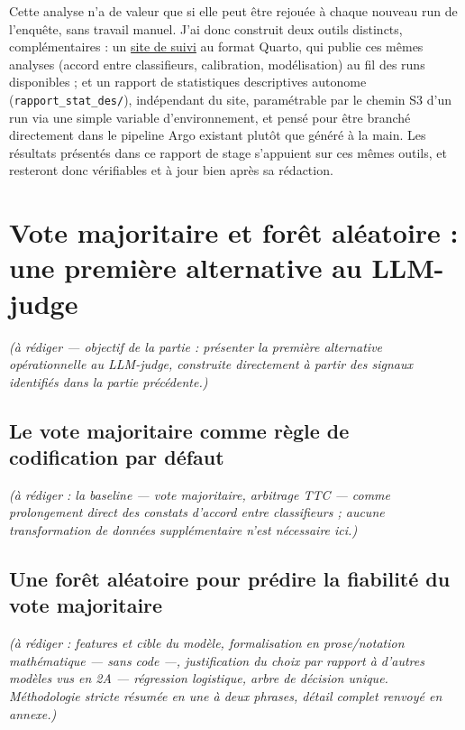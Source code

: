 \documentclass[
]{rapportCS}
\begin{document}
Cette analyse n'a de valeur que si elle peut être rejouée à chaque
nouveau run de l'enquête, sans travail manuel. J'ai donc construit deux
outils distincts, complémentaires : un
\href{https://mathiskacer.github.io/codification_auto_coicop}{site de
suivi} au format Quarto, qui publie ces mêmes analyses (accord entre
classifieurs, calibration, modélisation) au fil des runs disponibles ;
et un rapport de statistiques descriptives autonome
(\texttt{rapport\_stat\_des/}), indépendant du site, paramétrable par le
chemin S3 d'un run via une simple variable d'environnement, et pensé
pour être branché directement dans le pipeline Argo existant plutôt que
généré à la main. Les résultats présentés dans ce rapport de stage
s'appuient sur ces mêmes outils, et resteront donc vérifiables et à jour
bien après sa rédaction.

\newpage

\section{Vote majoritaire et forêt aléatoire : une première alternative
au
LLM-judge}\label{vote-majoritaire-et-foruxeat-aluxe9atoire-une-premiuxe8re-alternative-au-llm-judge}

\emph{(à rédiger --- objectif de la partie : présenter la première
alternative opérationnelle au LLM-judge, construite directement à partir
des signaux identifiés dans la partie précédente.)}

\subsection{Le vote majoritaire comme règle de codification par
défaut}\label{le-vote-majoritaire-comme-ruxe8gle-de-codification-par-duxe9faut}

\emph{(à rédiger : la baseline --- vote majoritaire, arbitrage TTC ---
comme prolongement direct des constats d'accord entre classifieurs ;
aucune transformation de données supplémentaire n'est nécessaire ici.)}

\subsection{Une forêt aléatoire pour prédire la fiabilité du vote
majoritaire}\label{une-foruxeat-aluxe9atoire-pour-pruxe9dire-la-fiabilituxe9-du-vote-majoritaire}

\emph{(à rédiger : features et cible du modèle, formalisation en
prose/notation mathématique --- sans code ---, justification du choix
par rapport à d'autres modèles vus en 2A --- régression logistique,
arbre de décision unique. Méthodologie stricte résumée en une à deux
phrases, détail complet renvoyé en annexe.)}
\end{document}

